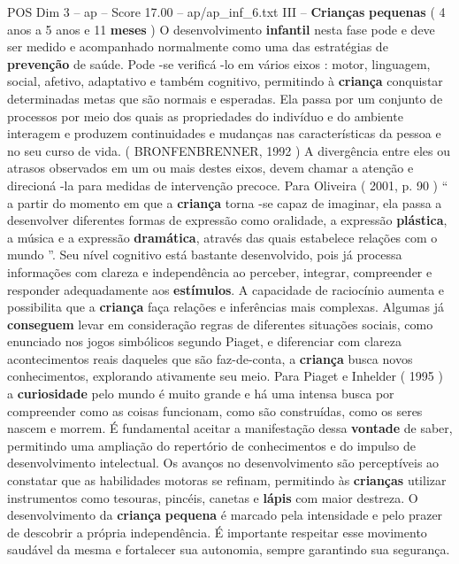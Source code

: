 \begin{textsample}{POS Dim 3 – ap – Score 17.00 – ap/ap\_inf\_6.txt}  \label{ex:f3_pos_189}
III – \textbf{Crianças} \textbf{pequenas} ( 4 anos a 5 anos e 11 \textbf{meses} ) O desenvolvimento \textbf{infantil} nesta fase pode e deve ser medido e acompanhado normalmente como uma das estratégias de \textbf{prevenção} de saúde.
Pode -se verificá -lo em vários eixos : motor, linguagem, social, afetivo, adaptativo e também cognitivo, permitindo à \textbf{criança} conquistar determinadas metas que são normais e esperadas.
Ela passa por um conjunto de processos por meio dos quais as propriedades do indivíduo e do ambiente interagem e produzem continuidades e mudanças nas características da pessoa e no seu curso de vida. ( BRONFENBRENNER, 1992 ) A divergência entre eles ou atrasos observados em um ou mais destes eixos, devem chamar a atenção e direcioná -la para medidas de intervenção precoce.
Para Oliveira ( 2001, p. 90 ) “ a partir do momento em que a \textbf{criança} torna -se capaz de imaginar, ela passa a desenvolver diferentes formas de expressão como oralidade, a expressão \textbf{plástica}, a música e a expressão \textbf{dramática}, através das quais estabelece relações com o mundo ”.
Seu nível cognitivo está bastante desenvolvido, pois já processa informações com clareza e independência ao perceber, integrar, compreender e responder adequadamente aos \textbf{estímulos}.
A capacidade de raciocínio aumenta e possibilita que a \textbf{criança} faça relações e inferências mais complexas.
Algumas já \textbf{conseguem} levar em consideração regras de diferentes situações sociais, como enunciado nos jogos simbólicos segundo Piaget, e diferenciar com clareza acontecimentos reais daqueles que são faz-de-conta, a \textbf{criança} busca novos conhecimentos, explorando ativamente seu meio.
Para Piaget e Inhelder ( 1995 ) a \textbf{curiosidade} pelo mundo é muito grande e há uma intensa busca por compreender como as coisas funcionam, como são construídas, como os seres nascem e morrem.
É fundamental aceitar a manifestação dessa \textbf{vontade} de saber, permitindo uma ampliação do repertório de conhecimentos e do impulso de desenvolvimento intelectual.
Os avanços no desenvolvimento são perceptíveis ao constatar que as habilidades motoras se refinam, permitindo às \textbf{crianças} utilizar instrumentos como tesouras, pincéis, canetas e \textbf{lápis} com maior destreza.
O desenvolvimento da \textbf{criança} \textbf{pequena} é marcado pela intensidade e pelo prazer de descobrir a própria independência.
É importante respeitar esse movimento saudável da mesma e fortalecer sua autonomia, sempre garantindo sua segurança.

\end{textsample}
